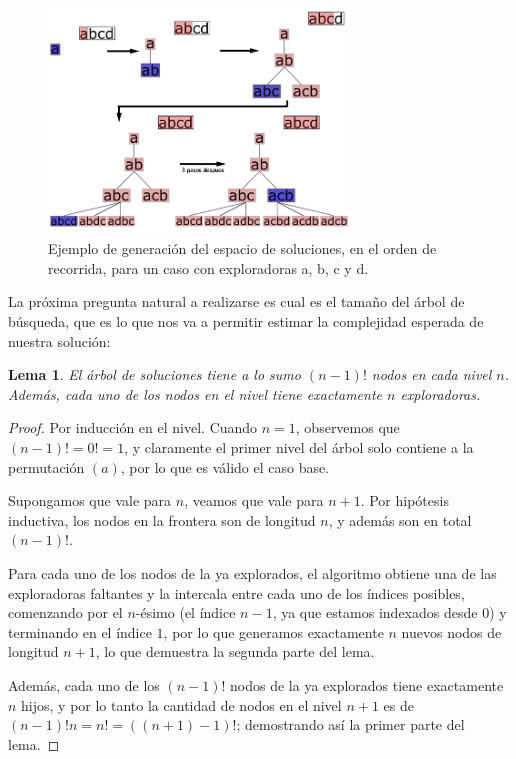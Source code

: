 \documentclass{article}
\newtheorem{lemma}{Lema}[theorem]
\theoremstyle{definition}
\theoremstyle{remark}
\begin{document}
\begin{figure}[h!]
\centering
\includegraphics[width=8cm]{images/treeEvolution}
\caption{Ejemplo de generación del espacio de soluciones, en el orden de recorrida, para un caso con exploradoras a, b, c y d.}
\end{figure}

La próxima pregunta natural a realizarse es cual es el tamaño del árbol de búsqueda, que es lo que nos va a permitir estimar la complejidad esperada de nuestra solución:

\begin{lemma}
El árbol de soluciones tiene a lo sumo $(n-1)!$ nodos en cada nivel $n$. Además, cada uno de los nodos en el nivel tiene exactamente $n$ exploradoras.
\end{lemma}

\begin{proof}
Por inducción en el nivel. Cuando $n = 1$, observemos que $(n-1)! = 0! = 1$, y claramente el primer nivel del árbol solo contiene a la permutación $(a)$, por lo que es válido el caso base.

Supongamos que vale para $n$, veamos que vale para $n+1$. Por hipótesis inductiva, los nodos en la frontera son de longitud $n$, y además son en total $(n-1)!$.

Para cada uno de los nodos de la ya explorados, el algoritmo obtiene una de las exploradoras faltantes y la intercala entre cada uno de los índices posibles, comenzando por el $n$-ésimo (el índice $n-1$, ya que estamos indexados desde $0$) y terminando en el índice $1$, por lo que generamos exactamente $n$ nuevos nodos de longitud $n+1$, lo que demuestra la segunda parte del lema.

Además, cada uno de los $(n-1)!$ nodos de la ya explorados tiene exactamente $n$ hijos, y por lo tanto la cantidad de nodos en el nivel $n+1$ es de $(n-1)! n = n! = ((n + 1) - 1)!$; demostrando así la primer parte del lema.
\end{proof}
\end{document}
